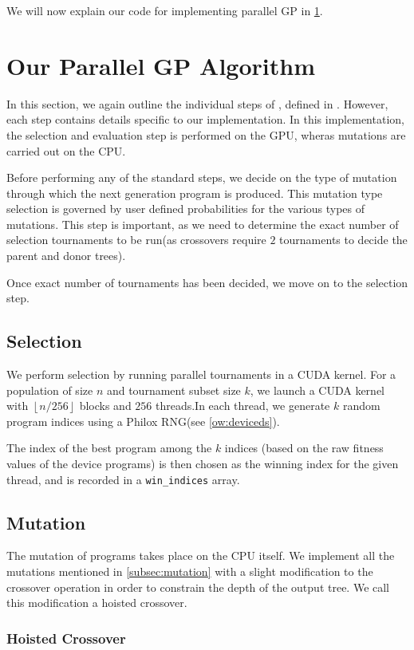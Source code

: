 We will now explain our code for implementing parallel GP in \cref*{ow:paralgo}.
\section{Our Parallel GP Algorithm}
\label{ow:paralgo}
In this section, we again outline the individual steps of , defined in . However, each step contains details specific to our implementation. In this implementation, the selection and evaluation step is performed on the GPU, wheras mutations are carried out on the CPU.

Before performing any of the standard steps, we decide on the type of mutation through which the next generation program is produced. This mutation type selection is governed by user defined probabilities for the various types of mutations. This step is important, as we need to determine the exact  number of selection tournaments to be run(as crossovers require $2$ tournaments to decide the parent and donor trees). 

Once exact number of tournaments has been decided, we move on to the selection step.

\subsection{Selection}
\label{ow:selection}
We perform selection by running parallel tournaments in a CUDA kernel. For a population of size $n$ and tournament subset size $k$, we launch a CUDA kernel with $\left\lfloor n/256 \right\rfloor $ blocks and $256$ threads.In each thread, we generate $k$ random program indices using a Philox RNG(see \cref{ow:deviceds}). 

The index of the best program among the $k$ indices (based on the raw fitness values of the device programs) is then chosen as the winning index for the given thread, and is recorded in a \lstinline!win_indices! array.

\subsection{Mutation}
\label{ow:mutation}
The mutation of programs takes place on the CPU itself. We implement all the mutations mentioned in \cref{subsec:mutation} with a slight modification to the crossover operation in order to constrain the depth of the output tree. We call this modification a hoisted crossover.  

\subsubsection{Hoisted Crossover}

